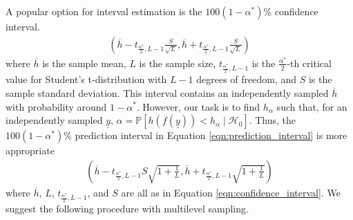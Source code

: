 \documentclass{tran-l}
\theoremstyle{cor}
\theoremstyle{definition}
\theoremstyle{remark}
\theoremstyle{conjecture}
\numberwithin{equation}{section}
\begin{document}
A popular option for interval estimation is the $100(1-\alpha^*)\%$ confidence interval.
\begin{align}
\left(\overline{h} - t_{\frac{\alpha^*}{2},L-1} \frac{S}{\sqrt{L}}, \overline{h} + t_{\frac{\alpha^*}{2},L-1} \frac{S}{\sqrt{L}}\right)\label{eqn:confidence_interval}
\end{align} where $\overline{h}$ is the sample mean, $L$ is the sample size, $t_{\frac{\alpha^*}{2}, L-1}$ is the $\frac{\alpha^*}{2}$-th critical value for Student's t-distribution with $L-1$ degrees of freedom, and $S$ is the sample standard deviation. This interval contains an independently sampled $\overline{h}$ with probability around $1-\alpha^*$.
However, our task is to find $h_\alpha$ such that, for an independently sampled $\underline{y}$, $\alpha = \mathbb{P}\left[h(f(\underline{y})) < h_\alpha \mid \mathcal{H}_0\right]$. Thus, the $100(1-\alpha^*)\%$ prediction interval in Equation \ref{eqn:prediction_interval} is more appropriate
\begin{align}\left(\overline{h} - t_{\frac{\alpha^*}{2},L-1} S \sqrt{1 + \frac{1}{L}}, \overline{h} + t_{\frac{\alpha^*}{2},L-1} \sqrt{1 + \frac{1}{L}}\right)\label{eqn:prediction_interval}
\end{align} where $\overline{h}$, $L$, $t_{\frac{\alpha^*}{2},L-1}$, and $S$ are all as in Equation \ref{eqn:confidence_interval}.
We suggest the following procedure with multilevel sampling.
\end{document}
